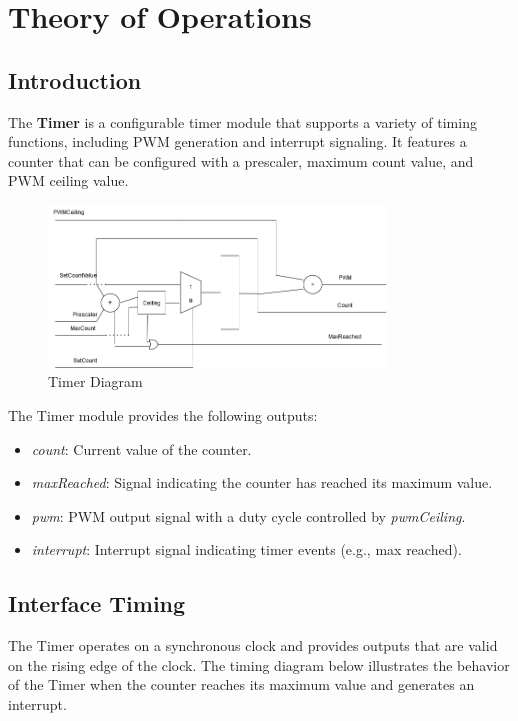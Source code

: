 \section{Theory of Operations}

\subsection{Introduction}
The \textbf{Timer} is a configurable timer module that supports a variety of timing functions, including PWM generation and interrupt signaling. It features a counter that can be configured with a prescaler, maximum count value, and PWM ceiling value.

\begin{figure}[h]
  \includegraphics[width=0.80\textwidth]{images/TimerDragram.drawio.png}
  \caption{Timer Diagram}\label{fig:timer-diagram}
\end{figure}

The Timer module provides the following outputs:

\begin{itemize}[noitemsep]
  \item{\textit{count}: Current value of the counter.}
  \item{\textit{maxReached}: Signal indicating the counter has reached its maximum value.}
  \item{\textit{pwm}: PWM output signal with a duty cycle controlled by \textit{pwmCeiling}.}
  \item{\textit{interrupt}: Interrupt signal indicating timer events (e.g., max reached).}
\end{itemize}

\subsection{Interface Timing}
The Timer operates on a synchronous clock and provides outputs that are valid on the rising edge of the clock. The timing diagram below illustrates the behavior of the Timer when the counter reaches its maximum value and generates an interrupt.


